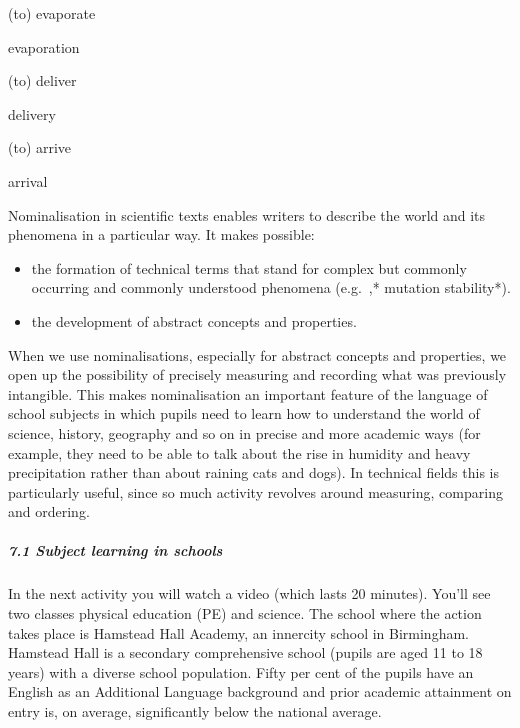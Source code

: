 \documentclass[letterpaper,10pt,english]{sphinxmanual}
\begin{document}
(to) evaporate





evaporation









(to) deliver





delivery









(to) arrive





arrival









Nominalisation in scientific texts enables writers to describe the world and its phenomena in a particular way. It makes possible:
\begin{itemize}
\item {} 
the formation of technical terms that stand for complex but commonly occurring \textendash{} and commonly understood \textendash{} phenomena (e.g. ,* mutation\sphinxstyleemphasis{,} stability*).

\item {} 
the development of abstract concepts and properties.

\end{itemize}

When we use nominalisations, especially for abstract concepts and properties, we open up the possibility of precisely measuring and recording what was previously intangible. This makes nominalisation an important feature of the language of school subjects in which pupils need to learn how to understand the world of science, history, geography and so on in precise and more academic ways (for example, they need to be able to talk about the rise in humidity and heavy precipitation rather than about
raining cats and dogs). In technical fields this is particularly useful, since so much activity revolves around measuring, comparing and ordering.


\subparagraph{7.1 Subject learning in schools}
\label{\detokenize{content/session_00/Part_00_07:7.1-Subject-learning-in-schools}}
In the next activity you will watch a video (which lasts 20 minutes). You’ll see two classes \textendash{} physical education (PE) and science. The school where the action takes place is Hamstead Hall Academy, an inner\sphinxhyphen{}city school in Birmingham. Hamstead Hall is a secondary comprehensive school (pupils are aged 11 to 18 years) with a diverse school population. Fifty per cent of the pupils have an English as an Additional Language background and prior academic attainment on entry is, on average,
significantly below the national average.
\end{document}
